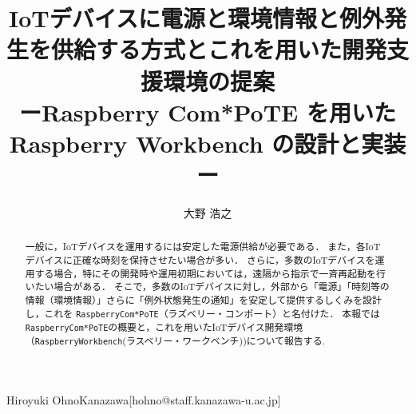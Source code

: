 
\title{
  IoTデバイスに電源と環境情報と例外発生を供給する方式とこれを用いた開発支援環境の提案\\
  \huge{ーRaspberry Com*PoTE を用いた Raspberry Workbench の設計と実装ー}
}


\author{大野 浩之}{Hiroyuki Ohno}{Kanazawa}[hohno@staff.kanazawa-u.ac.jp]





\begin{abstract}
 一般に，IoTデバイスを運用するには安定した電源供給が必要である．
 また，各IoTデバイスに正確な時刻を保持させたい場合が多い．
 さらに，多数のIoTデバイスを運用する場合，特にその開発時や運用初期においては，遠隔から指示で一斉再起動を行いたい場合がある．
 そこで，多数のIoTデバイスに対し，外部から「電源」「時刻等の情報（環境情報）」さらに「例外状態発生の通知」を安定して提供するしくみを設計し，これを {\tt Raspberry\-Com*PoTE}（ラズベリー・コンポート）と名付けた．
 本報では{\tt Raspberry\-Com*PoTE}の概要と，これを用いたIoTデバイス開発環境（{\tt Raspberry\-Workbench}(ラスベリー・ワークベンチ))について報告する.
\end{abstract}


